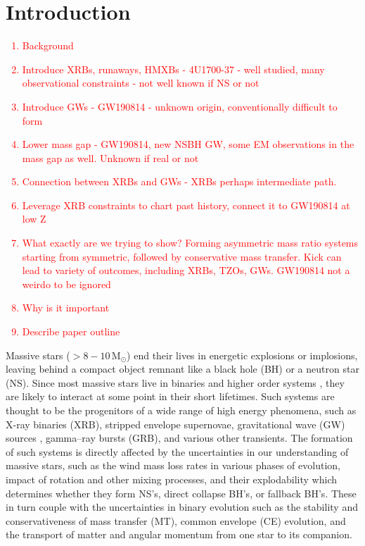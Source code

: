 \documentclass[linenumbers,trackchanges,twocolumn]{aastex701}
\newcommand{\Mdot}{\mathrm{M}_{\odot}}
\newcommand{\red}{\textcolor{red}}
\begin{document}
\section{Introduction}
\red{
\begin{enumerate}
    \item Background
    \item Introduce XRBs, runaways, HMXBs - 4U1700-37 - well studied, many observational constraints - not well known if NS or not
    \item Introduce GWs  - GW190814 - unknown origin, conventionally difficult to form
    \item Lower mass gap - GW190814, new NSBH GW, some EM observations in the mass gap as well. Unknown if real or not
    \item Connection between XRBs and GWs - XRBs perhaps intermediate path.
    \item Leverage XRB constraints to chart past history, connect it to GW190814 at low Z
    \item What exactly are we trying to show? Forming asymmetric mass ratio systems starting from symmetric, followed by conservative mass transfer. Kick can lead to variety of outcomes, including XRBs, TZOs, GWs. GW190814 not a weirdo to be ignored
    \item Why is it important
    \item Describe paper outline
\end{enumerate}
}

Massive stars ($> 8-10\,\Mdot$) end their lives in energetic explosions or implosions, leaving behind a compact object remnant like a black hole (BH) or a neutron star (NS). Since most massive stars live in binaries and higher order systems \cite{2012Sci...337..444S,2023ASPC..534..275O}, they are likely to interact at some point in their short lifetimes. Such systems are thought to be the progenitors of a wide range of high energy phenomena, such as X-ray binaries (XRB), stripped envelope supernovae, gravitational wave (GW) sources \cite{2023PhRvX..13d1039A}, gamma--ray bursts (GRB), and various other transients. The formation of such systems is directly affected by the uncertainties in our understanding of massive stars, such as the wind mass loss rates in various phases of evolution, impact of rotation and other mixing processes, and their explodability which determines whether they form NS's, direct collapse BH's, or fallback BH's. These in turn couple with the uncertainties in binary evolution such as the stability and conservativeness of mass transfer (MT), common envelope (CE) evolution, and the transport of matter and angular momentum from one star to its companion.
\end{document}
